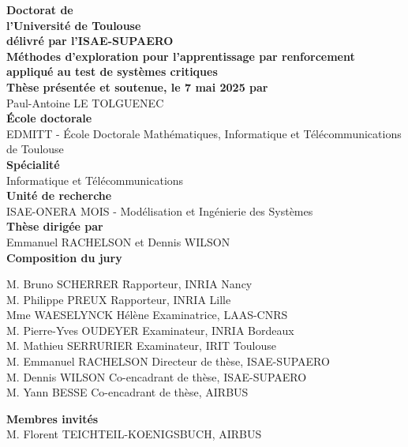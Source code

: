 \documentclass[a4paper,12pt]{article}
\begin{document}
\begin{center}
    \textbf{\LARGE Doctorat de\\ l'Université de Toulouse} \\[0.5cm]
    \textbf{\large délivré par l'ISAE-SUPAERO} \\[2cm]
    
    \textbf{\Huge Méthodes d'exploration pour l'apprentissage par renforcement appliqué au test de systèmes critiques} \\[1.5cm]
    
    \textbf{\Large Thèse présentée et soutenue, le 7 mai 2025 par} \\[0.5cm]
    
    {\LARGE Paul-Antoine LE TOLGUENEC} \\[2cm]

    \textbf{\large École doctorale} \\
    {\Large EDMITT - École Doctorale Mathématiques, Informatique et Télécommunications de Toulouse} \\[0.5cm]
    
    \textbf{\large Spécialité} \\
    {\Large Informatique et Télécommunications} \\[0.5cm]
    
    \textbf{\large Unité de recherche} \\
    {\Large ISAE-ONERA MOIS - Modélisation et Ingénierie des Systèmes} \\[2cm]
    
    \textbf{\large Thèse dirigée par} \\
    {\Large Emmanuel RACHELSON et Dennis WILSON} \\[2cm]
    
    \textbf{\large Composition du jury} \\
    {\begin{tabbing}
    M. Bruno SCHERRER \hspace{2cm} \= Rapporteur, INRIA Nancy \\
    M. Philippe PREUX \> Rapporteur, INRIA Lille \\
    Mme WAESELYNCK Hélène \> Examinatrice, LAAS-CNRS \\
    M. Pierre-Yves OUDEYER \> Examinateur, INRIA Bordeaux \\
    M. Mathieu SERRURIER \> Examinateur, IRIT Toulouse \\
    M. Emmanuel RACHELSON \> Directeur de thèse, ISAE-SUPAERO \\
    M. Dennis WILSON \> Co-encadrant de thèse, ISAE-SUPAERO \\
    M. Yann BESSE \> Co-encadrant de thèse, AIRBUS
    \end{tabbing}}
    
    \textbf{\large Membres invités} \\
    {\Large M. Florent TEICHTEIL-KOENIGSBUCH, AIRBUS} 
\end{center}
\end{document}
